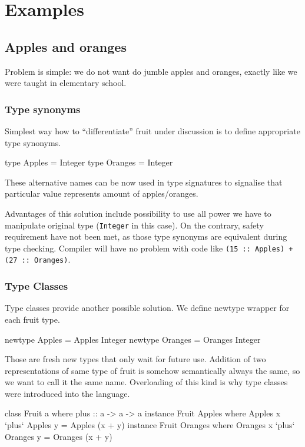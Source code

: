 \documentclass[11pt,oneside,draft]{fithesis2}
\newcommand\uv[1]{``#1''}
\theoremstyle{definition}
\begin{document}
\chapter{Examples}

\section{Apples and oranges}

Problem is simple: we do not want do jumble apples and oranges,
exactly like we were taught in elementary school.

\subsection{Type synonyms}

Simplest way how to \uv{differentiate} fruit under discussion is to define
appropriate type synonyms.
\begin{code}
type Apples  = Integer
type Oranges = Integer
\end{code}
These alternative names can be now used in type signatures to signalise that
particular value represents amount of apples/oranges.

Advantages of this solution include possibility to use all power we have
to manipulate original type (\texttt{Integer} in this case). On the contrary,
safety requirement have not been met, as those type synonyms are equivalent
during type checking. Compiler will have no problem with
code like \texttt{(15 :: Apples) + (27 :: Oranges)}.

\subsection{Type Classes}

Type classes provide another possible solution. We define newtype wrapper
for each fruit type.
\begin{code}
newtype Apples  = Apples  Integer
newtype Oranges = Oranges Integer
\end{code}

Those are fresh new types that only wait for future use.
Addition of two representations of same type of fruit is somehow semantically
always the same, so we want to call it the same name. Overloading of this kind is why
type classes were introduced into the language.
\begin{code}
class Fruit a where
    plus :: a -> a -> a
instance Fruit Apples where
	Apples x `plus` Apples y = Apples (x + y)
instance Fruit Oranges where
	Oranges x `plus` Oranges y = Oranges (x + y)
\end{code}
\end{document}

